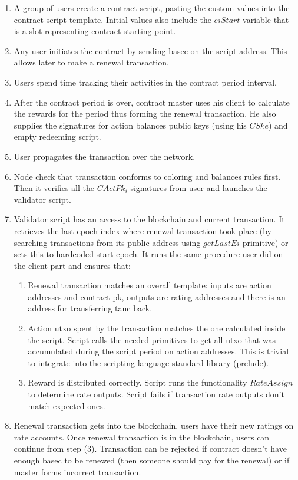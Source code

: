 \documentclass[]{itmo-student-thesis}
\begin{document}
\begin{enumerate}
\item A group of users create a contract script, pasting the custom
  values into the contract script template. Initial values also
  include the $eiStart$ variable that is a slot representing contract
  starting point.
\item Any user initiates the contract by sending basec on the script
  address. This allows later to make a renewal transaction.
\item Users spend time tracking their activities in the contract
  period interval.
\item After the contract period is over, contract master uses his
  client to calculate the rewards for the period thus forming the
  renewal transaction. He also supplies the signatures for action
  balances public keys (using his $CSke$) and empty redeeming script.
\item User propagates the transaction over the network.
\item Node check that transaction conforms to coloring and balances
  rules first. Then it verifies all the $CActPk_i$ signatures from
  user and launches the validator script.
\item Validator script has an access to the blockchain and current
  transaction. It retrieves the last epoch index where renewal
  transaction took place (by searching transactions from its public
  address using $getLastEi$ primitive) or sets this to hardcoded start
  epoch. It runs the same procedure user did on the client part and
  ensures that:
  \begin{enumerate}
  \item Renewal transaction matches an overall template: inputs are
    action addresses and contract pk, outputs are rating addresses and
    there is an address for transferring tauc back.
  \item Action utxo spent by the transaction matches the one
    calculated inside the script. Script calls the needed primitives
    to get all utxo that was accumulated during the script period on
    action addresses. This is trivial to integrate into the scripting
    language standard library (prelude).
  \item Reward is distributed correctly. Script runs the functionality
    $RateAssign$ to determine rate outputs. Script fails if
    transaction rate outputs don’t match expected ones.
  \end{enumerate}
\item Renewal transaction gets into the blockchain, users have their
  new ratings on rate accounts. Once renewal transaction is in the
  blockchain, users can continue from step (3). Transaction can be
  rejected if contract doesn’t have enough basec to be renewed (then
  someone should pay for the renewal) or if master forms incorrect
  transaction.
\end{enumerate}
\end{document}

